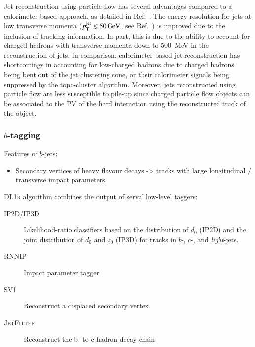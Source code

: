 Jet reconstruction using particle flow has several advantages compared to a
calorimeter-based approach, as detailed in Ref.~\cite{PERF-2015-09}. The energy
resolution for jets at low transverse momenta
($p_{\text{T}}^{\text{jet}} \lesssim \SI{50}{\ensuremath{\text{GeV}}}$, see Ref.~\cite{JETM-2018-05}) is
improved due to the inclusion of tracking information. In part, this is due to
the ability to account for charged hadrons with transverse momenta down to
\SI{500}{\MeV} in the reconstruction of jets. In comparison, calorimeter-based
jet reconstruction has shortcomings in accounting for low-\pT charged hadrons
due to charged hadrons being bent out of the jet clustering cone, or their
calorimeter signals being suppressed by the topo-cluster algorithm. Moreover,
jets reconstructed using particle flow are less susceptible to pile-up since
charged particle flow objects can be associated to the PV of the hard
interaction using the reconstructed track of the object.


\subsubsection{$b$-tagging}

Features of $b$-jets:
\begin{itemize}
\item Secondary vertices of heavy flavour decays -> tracks with large
  longitudinal / transverse impact parameters.

\end{itemize}

\textsc{DL1r} algorithm combines the output of serval low-level taggers:
\begin{description}

\item[\textsc{IP2D}/\textsc{IP3D}] Likelihood-ratio classifiers based on the
  distribution of $d_0$ (\textsc{IP2D}) and the joint distribution of $d_0$ and
  $z_0$ (\textsc{IP3D}) for tracks in $b$-, $c$-, and \emph{light}-jets.

\item[\textsc{RNNIP}] Impact parameter tagger

\item[\textsc{SV1}] Reconstruct a displaced secondary vertex

\item[\textsc{JetFitter}] Reconstruct the b- to c-hadron decay chain

\end{description}





